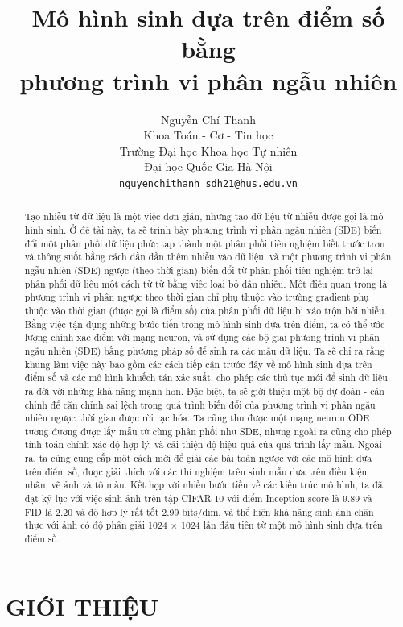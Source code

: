 \documentclass{article} %
\title{Mô hình sinh dựa trên điểm số bằng \\ phương trình vi phân ngẫu nhiên}
\author{Nguyễn Chí Thanh \\
Khoa Toán - Cơ - Tin học\\
Trường Đại học Khoa học Tự nhiên\\
Đại học Quốc Gia Hà Nội \\
\texttt{nguyenchithanh\_sdh21@hus.edu.vn} \\
}
\begin{document}
\maketitle

\begin{abstract}
    Tạo nhiễu từ dữ liệu là một việc đơn giản, nhưng tạo dữ liệu từ nhiễu được gọi là mô hình sinh.
    Ở đề tài này, ta sẽ trình bày phương trình vi phân ngẫu nhiên (SDE) biến đổi một phân phối dữ liệu phức tạp thành một phân phối tiên nghiệm biết trước trơn và thông suốt bằng cách dần dần thêm nhiễu vào dữ liệu,
    và một phương trình vi phân ngẫu nhiên (SDE) ngược (theo thời gian) biến đổi từ phân phối tiên nghiệm trở lại phân phối dữ liệu một cách từ từ bằng việc loại bỏ dần nhiễu.
    Một điều quan trọng là phương trình vi phân ngược theo thời gian chỉ phụ thuộc vào trường gradient phụ thuộc vào thời gian (được gọi là điểm số) của phân phối dữ liệu bị xáo trộn bởi nhiễu.
    Bằng việc tận dụng những bước tiến trong mô hình sinh dựa trên điểm, ta có thể ước lượng chính xác điểm với mạng neuron, và sử dụng các bộ giải phương trình vi phân ngẫu nhiên (SDE) bằng phương pháp số để sinh ra các mẫu dữ liệu.
    Ta sẽ chỉ ra rằng khung làm việc này bao gồm các cách tiếp cận trước đây về mô hình sinh dựa trên điểm số và các mô hình khuếch tán xác suất, cho phép các thủ tục mới để sinh dữ liệu ra đời với những khả năng mạnh hơn.
    Đặc biệt, ta sẽ giới thiệu một bộ dự đoán - căn chỉnh để căn chỉnh sai lệch trong quá trình biến đổi của phương trình vi phân ngẫu nhiên ngược thời gian được rời rạc hóa.
    Ta cũng thu được một mạng neuron ODE tương đương được lấy mẫu từ cùng phân phối như SDE, nhưng ngoài ra cũng cho phép tính toán chính xác độ hợp lý, và cải thiện độ hiệu quả của quá trình lấy mẫu.
    Ngoài ra, ta cũng cung cấp một cách mới để giải các bài toán ngược với các mô hình dựa trên điểm số, được giải thích với các thí nghiệm trên sinh mẫu dựa trên điều kiện nhãn, vẽ ảnh và tô màu.
    Kết hợp với nhiều bước tiến về các kiến trúc mô hình, ta đã đạt kỷ lục với việc sinh ảnh trên tập CIFAR-10 với điểm Inception score là 9.89 và FID là 2.20 và độ hợp lý rất tốt 2.99 bits/dim, và thể hiện khả năng sinh ảnh chân thực với ảnh có độ phân giải 1024 $\times$ 1024 lần đầu tiên từ một mô hình sinh dựa trên điểm số.
\end{abstract}

\section{GIỚI THIỆU} \label{1}
\end{document}
